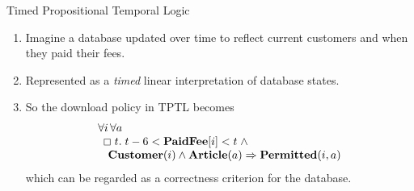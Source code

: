 \documentclass[style=sailor,size=12pt]{powerdot}
\newcommand{\bid}[1]{\mbox{\bf #1}}
\begin{document}
\begin{wideslide}[bm=,toc=]{Timed Propositional Temporal Logic}
\begin{enumerate}
\item Imagine a database updated over time to reflect current customers and when they paid their fees.
\item Represented as a {\em timed\/} linear interpretation of database states.
\item So the download policy in TPTL becomes
\begin{displaymath}
\begin{array}{l}
\forall i\, \forall a\, \\
\>\> \Box\; t.\;t - 6 < \bid{PaidFee}[i] < t\; \wedge \\
\>\>\>\>\bid{Customer}(i) \wedge \bid{Article}(a) \Rightarrow
\bid{Permitted}(i,a)
\end{array}
\end{displaymath}
which can be regarded as a correctness criterion for the database.
\end{enumerate}
\end{wideslide}
\end{document}
